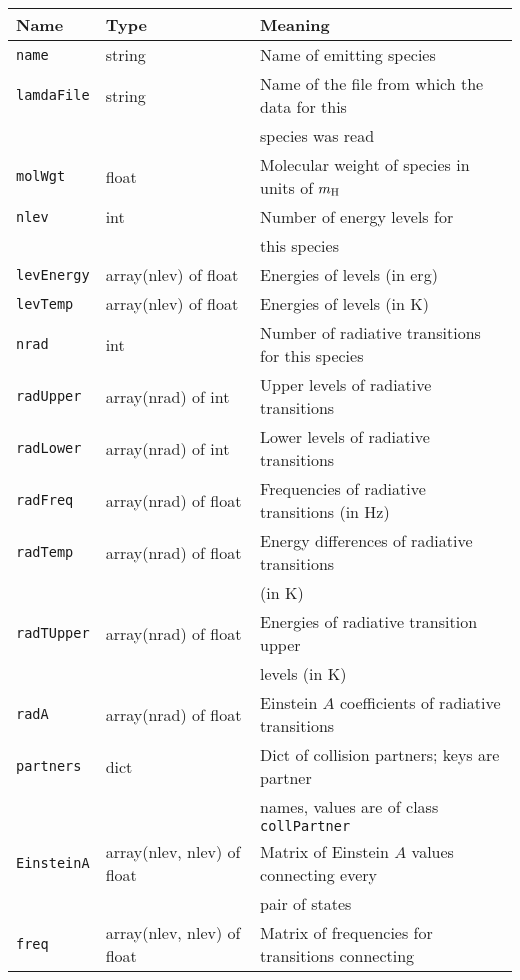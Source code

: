 \documentclass[12pt]{article}
\begin{document}
\begin{table}
\begin{center}
\begin{tabular}{lll}
\hline\hline
Name & Type & Meaning \\
\hline\hline
\texttt{name} & string & Name of emitting species \\
\texttt{lamdaFile} & string & Name of the file from which the data for this \\
& & \quad species was read \\
\texttt{molWgt} & float & Molecular weight of species in units of $m_{\rm H}$ \\
\texttt{nlev} & int & Number of energy levels for \\
& & \quad this species \\
\texttt{levEnergy} & array(nlev) of float & Energies of levels (in erg) \\
\texttt{levTemp} & array(nlev) of float & Energies of levels (in K) \\
\texttt{nrad} & int & Number of radiative transitions for this species \\
\texttt{radUpper} & array(nrad) of int & Upper levels of radiative transitions \\
\texttt{radLower} & array(nrad) of int & Lower levels of radiative transitions \\
\texttt{radFreq} & array(nrad) of float & Frequencies of radiative transitions (in Hz) \\
\texttt{radTemp} & array(nrad) of float & Energy differences of radiative transitions \\
& & \quad (in K) \\
\texttt{radTUpper} & array(nrad) of float & Energies of radiative transition upper \\
& & \quad levels (in K) \\
\texttt{radA} & array(nrad) of float & Einstein $A$ coefficients of radiative transitions\\
\texttt{partners} & dict & Dict of collision partners; keys are partner \\
& & \quad names, values are of class \texttt{collPartner} \\
\texttt{EinsteinA} & array(nlev, nlev) of float & Matrix of Einstein $A$ values connecting every \\
& & \quad pair of states\\
\texttt{freq} & array(nlev, nlev) of float & Matrix of frequencies for transitions connecting \\

\end{tabular}
\end{center}
\end{table}
\end{document}
